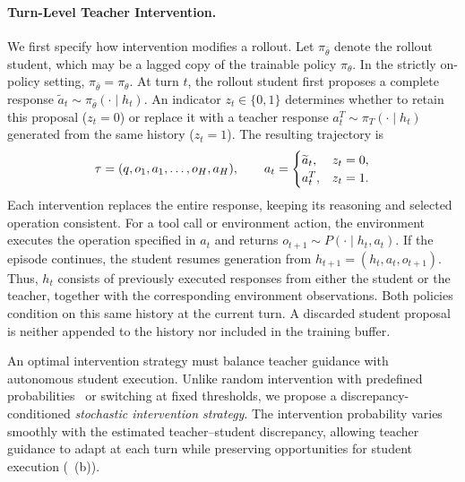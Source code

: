 \paragraph{Turn-Level Teacher Intervention.}
We first specify how intervention modifies a rollout.
Let $\pi_{\bar\theta}$ denote the rollout student, which may be a lagged copy of the trainable policy $\pi_\theta$.
In the strictly on-policy setting, $\pi_{\bar\theta}=\pi_\theta$.
At turn $t$, the rollout student first proposes a complete response $\widetilde{a}_t\sim\pi_{\bar\theta}(\cdot\mid h_t)$.
An indicator $z_t\in\{0,1\}$ determines whether to retain this proposal ($z_t=0$) or replace it with a teacher response $a_t^T\sim\pi_T(\cdot\mid h_t)$ generated from the same history ($z_t=1$).
The resulting trajectory is
\begin{equation}
    \setlength\abovedisplayskip{1.3pt}
    \setlength\belowdisplayskip{1.3pt}
    \tau=(q,o_1,a_1,\ldots,o_H,a_H),
    \qquad
    a_t=
    \begin{cases}
        \widetilde{a}_t, & z_t=0,\\
        a_t^T, & z_t=1.
    \end{cases}
    \label{eq:intervened_trajectory}
\end{equation}
Each intervention replaces the entire response, keeping its reasoning and selected operation consistent.
For a tool call or environment action, the environment executes the operation specified in $a_t$ and returns $o_{t+1}\sim P(\cdot\mid h_t,a_t)$.
If the episode continues, the student resumes generation from $h_{t+1}=(h_t,a_t,o_{t+1})$.
Thus, $h_t$ consists of previously executed responses from either the student or the teacher, together with the corresponding environment observations.
Both policies condition on this same history at the current turn.
A discarded student proposal is neither appended to the history nor included in the training buffer.

An optimal intervention strategy must balance teacher guidance with autonomous student execution.
Unlike random intervention with predefined probabilities~\citep{abs-2606-15912} or switching at fixed thresholds, we propose a discrepancy-conditioned \emph{stochastic intervention strategy}.
The intervention probability varies smoothly with the estimated teacher--student discrepancy, allowing teacher guidance to adapt at each turn while preserving opportunities for student execution (~(b)).


\vspace{-0.5em}
